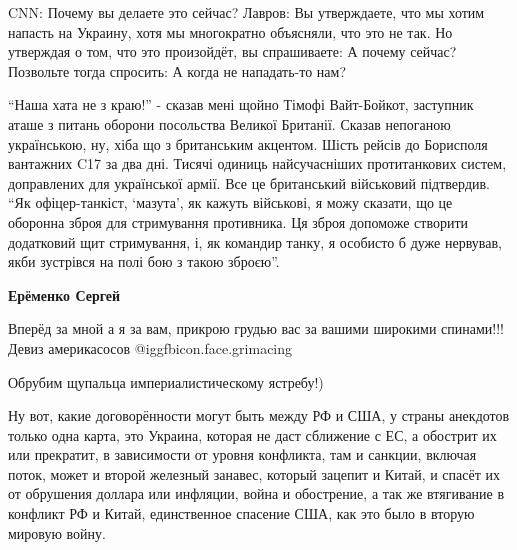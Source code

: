 \begin{itemize}

CNN: Почему вы делаете это сейчас? Лавров: Вы утверждаете, что мы хотим напасть
на Украину, хотя мы многократно объясняли, что это не так. Но утверждая о том,
что это произойдёт, вы спрашиваете: А почему сейчас? Позвольте тогда спросить:
А когда не нападать-то нам?



\enquote{Наша хата не з краю!} - сказав мені щойно Тімофі Вайт-Бойкот, заступник аташе
з питань оборони посольства Великої Британії. Сказав непоганою українською, ну,
хіба що з британським акцентом. Шість рейсів до Борисполя вантажних C17 за два
дні. Тисячі одиниць найсучасніших протитанкових систем, доправлених для
української армії. Все це британський військовий підтвердив. \enquote{Як
офіцер-танкіст, \enquote{мазута}, як кажуть військові, я можу сказати, що це оборонна
зброя для стримування противника. Ця зброя допоможе створити додатковий щит
стримування, і, як командир танку, я особисто б дуже нервував, якби зустрівся
на полі бою з такою зброєю}.

\textbf{Ерёменко Сергей}

Вперёд за мной а я за вам, прикрою грудью вас за вашими широкими спинами!!!
Девиз америкасосов @igg{fbicon.face.grimacing} 

Обрубим щупальца империалистическому ястребу!)


Ну вот, какие договорённости могут быть между РФ и США, у страны анекдотов
только одна карта, это Украина, которая не даст сближение с ЕС, а обострит их
или прекратит, в зависимости от уровня конфликта, там и санкции, включая поток,
может и второй железный занавес, который зацепит и Китай, и спасёт их от
обрушения доллара или инфляции, война и обострение, а так же втягивание в
конфликт РФ и Китай, единственное спасение США, как это было в вторую мировую
войну.

\end{itemize} %
